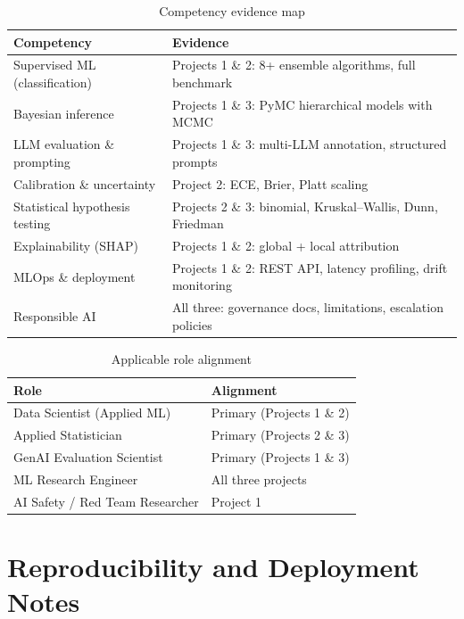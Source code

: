 \documentclass[11pt,a4paper]{article}
\begin{document}
\begin{table}[H]
\centering
\caption{Competency evidence map}
\begin{tabular}{lp{9cm}}
\toprule
\textbf{Competency} & \textbf{Evidence} \\
\midrule
Supervised ML (classification) & Projects 1 \& 2: 8+ ensemble algorithms, full benchmark \\
Bayesian inference & Projects 1 \& 3: PyMC hierarchical models with MCMC \\
LLM evaluation \& prompting & Projects 1 \& 3: multi-LLM annotation, structured prompts \\
Calibration \& uncertainty & Project 2: ECE, Brier, Platt scaling \\
Statistical hypothesis testing & Projects 2 \& 3: binomial, Kruskal--Wallis, Dunn, Friedman \\
Explainability (SHAP) & Projects 1 \& 2: global + local attribution \\
MLOps \& deployment & Projects 1 \& 2: REST API, latency profiling, drift monitoring \\
Responsible AI & All three: governance docs, limitations, escalation policies \\
\bottomrule
\end{tabular}
\label{tab:competency}
\end{table}

\begin{table}[H]
\centering
\caption{Applicable role alignment}
\begin{tabular}{ll}
\toprule
\textbf{Role} & \textbf{Alignment} \\
\midrule
Data Scientist (Applied ML) & Primary (Projects 1 \& 2) \\
Applied Statistician & Primary (Projects 2 \& 3) \\
GenAI Evaluation Scientist & Primary (Projects 1 \& 3) \\
ML Research Engineer & All three projects \\
AI Safety / Red Team Researcher & Project 1 \\
\bottomrule
\end{tabular}
\label{tab:roles}
\end{table}

\section{Reproducibility and Deployment Notes}
\end{document}
